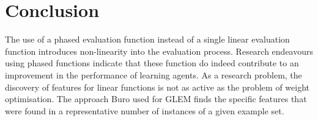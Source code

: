 %
%
%
%
%
%
%
\section{Conclusion}
\label{sec:learning-conclusion}
The use of a phased evaluation function instead of a single linear evaluation function introduces non-linearity into the evaluation process. Research endeavours using phased functions indicate that these function do indeed contribute to an improvement in the  performance of learning agents.  As a research problem, the discovery of features for linear functions is not as active as the problem of weight optimisation.  The approach Buro used for GLEM finds the specific features that were found in a representative number of instances of a given example set.

